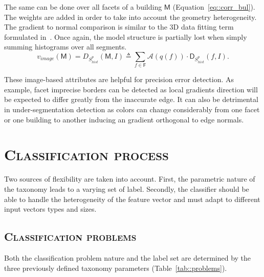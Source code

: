         The same can be done over all facets of a building $\mathsf{M}$ (Equation~\ref{eq::corr_bul}). The weights are added in order to take into account the geometry heterogeneity. The gradient to normal comparison is similar to the 3D data fitting term formulated in~\parencite{li2016boxfitting}. Once again, the model structure is partially lost when simply summing histograms over all segments.
        \begin{equation}
            \label{eq::corr_bul}
            v_{image}(\mathsf{M}) = D_{S_{hist}^p}(\mathsf{M}, I) \triangleq \sum_{f \in \mathsf{F}} \mathscr{A}(q(f)) \cdot \mathsf{D}_{S_{hist}^p}(f, I).
        \end{equation}
        
        These image-based attributes are helpful for precision error detection. As example, facet imprecise borders can be detected as local gradients direction will be expected to differ greatly from the inaccurate edge. It can also be detrimental in under-segmentation detection as colors can change considerably from one facet or one building to another inducing an gradient orthogonal to edge normals.

    \section{\textsc{Classification process}}
        Two sources of flexibility are taken into account.
        First, the parametric nature of the taxonomy leads to a varying set of label.
        Secondly, the classifier should be able to handle the heterogeneity of the feature vector and must adapt to different input vectors types and sizes.

    \subsection{\textsc{Classification problems}}
        Both the classification problem nature and the label set are determined by the three previously defined taxonomy parameters (Table~\ref{tab::problems}).

